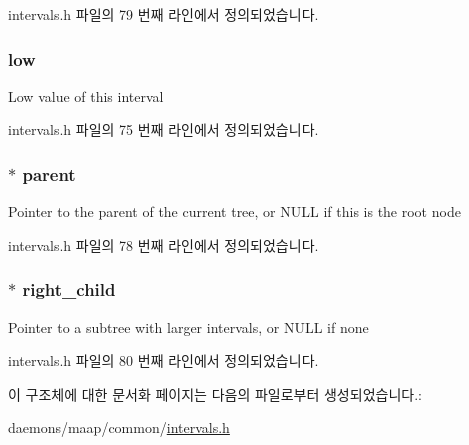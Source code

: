 intervals.\+h 파일의 79 번째 라인에서 정의되었습니다.

\subsubsection[{\texorpdfstring{low}{low}}]{ low}\hypertarget{structinterval__node_a864f755b7008df85b29726891bdd4fbd}{}\label{structinterval__node_a864f755b7008df85b29726891bdd4fbd}
Low value of this interval 

intervals.\+h 파일의 75 번째 라인에서 정의되었습니다.

\subsubsection[{\texorpdfstring{parent}{parent}}]{$\ast$ parent}\hypertarget{structinterval__node_a19c68cbcb58e99454185ab1aa37de6e8}{}\label{structinterval__node_a19c68cbcb58e99454185ab1aa37de6e8}
Pointer to the parent of the current tree, or N\+U\+LL if this is the root node 

intervals.\+h 파일의 78 번째 라인에서 정의되었습니다.

\subsubsection[{\texorpdfstring{right\+\_\+child}{right_child}}]{$\ast$ right\+\_\+child}\hypertarget{structinterval__node_a65f75e0585d71e757722bf624913127f}{}\label{structinterval__node_a65f75e0585d71e757722bf624913127f}
Pointer to a subtree with larger intervals, or N\+U\+LL if none 

intervals.\+h 파일의 80 번째 라인에서 정의되었습니다.



이 구조체에 대한 문서화 페이지는 다음의 파일로부터 생성되었습니다.\+:\begin{DoxyCompactItemize}
\item 
daemons/maap/common/\hyperlink{intervals_8h}{intervals.\+h}\end{DoxyCompactItemize}
